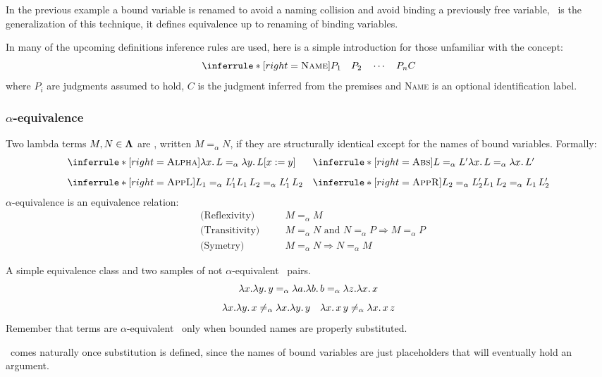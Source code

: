In the previous example a bound variable is renamed to avoid a naming collision and avoid binding a previously free variable, \aequiv \ is the generalization of this technique, it defines equivalence up to renaming of binding variables.

\begin{notation}
  In many of the upcoming definitions inference rules are used, here is a simple introduction for those unfamiliar with the concept:
  \[
    \inferrule*[right=\textsc{Name}]{
      P_1 \quad P_2 \quad \cdots \quad P_n
    }{
      C
    }
  \]
  where $P_i$ are judgments assumed to hold, $C$ is the judgment inferred from the premises and \textsc{Name} is an optional identification label.
\end{notation}
\subsubsection{\centering $\alpha$-equivalence}
\begin{definition} Two lambda terms \( M, N \in \mathbf{\Lambda} \) are \aequivlt, written \( M =_\alpha N \), if they are structurally identical except for the names of bound variables.
  Formally:
  \[
    \begin{array}{@{}l@{\quad}l@{}}
      \inferrule*[right=\textsc{Alpha}]
      { }
      { \lam{x}{L} =_\alpha \la y . \, L \subst{x}{y} }
      &
        \inferrule*[right=\textsc{Abs}]
        { L =_\alpha L' }
        { \lam{x}{L} =_\alpha \lam{x}{L'} } \\[2ex]
      \inferrule*[right=\textsc{AppL}]
      { L_1 =_\alpha L_1' }
      { L_1\,L_2 =_\alpha L_1'\,L_2 }
      &
        \inferrule*[right=\textsc{AppR}]
        { L_2 =_\alpha L_2' }
        { L_1\,L_2 =_\alpha L_1\,L_2' }
    \end{array}
  \]
  $\alpha$-equivalence is an equivalence relation:
  \[
    \begin{aligned}
      &\text{(Reflexivity)} \quad && M =_\alpha M \\
      &\text{(Transitivity)} \quad && M =_\alpha N \text{ and } N =_\alpha P \Rightarrow M =_\alpha P \\
      &\text{(Symetry)} \quad && M =_\alpha N \Rightarrow N =_\alpha M
    \end{aligned}
  \]
\end{definition}
\begin{example} A simple equivalence class and two samples of not $\alpha$-equivalent \ pairs.
  \[
    \lambda x.\lambda y. \, y =_\alpha \lambda a.\lambda b. \, b =_\alpha \lambda z.\lambda x. \, x
  \]
  \[
    \lambda x. \lambda y. \, x \not=_\alpha \lambda x. \lambda y. \, y \quad \lambda x. \, x \, y \not=_\alpha \lambda x. \, x \, z 
  \]
  Remember that terms are $\alpha$-equivalent \ only when bounded names are properly substituted.
\end{example}
\begin{remark}
  \aequiv \ comes naturally once substitution is defined, since the names of bound variables are just placeholders that will eventually hold an argument.
\end{remark}

